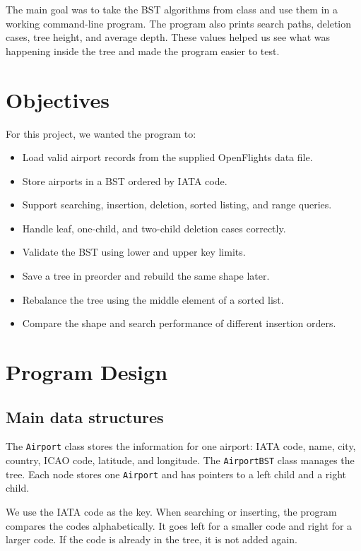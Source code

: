 \documentclass[12pt]{article}
\begin{document}
The main goal was to take the BST algorithms from class and use them in a working command-line program. The program also prints search paths, deletion cases, tree height, and average depth. These values helped us see what was happening inside the tree and made the program easier to test.

\section{Objectives}

For this project, we wanted the program to:

\begin{itemize}
    \item Load valid airport records from the supplied OpenFlights data file.
    \item Store airports in a BST ordered by IATA code.
    \item Support searching, insertion, deletion, sorted listing, and range queries.
    \item Handle leaf, one-child, and two-child deletion cases correctly.
    \item Validate the BST using lower and upper key limits.
    \item Save a tree in preorder and rebuild the same shape later.
    \item Rebalance the tree using the middle element of a sorted list.
    \item Compare the shape and search performance of different insertion orders.
\end{itemize}

\section{Program Design}

\subsection{Main data structures}

The \texttt{Airport} class stores the information for one airport: IATA code, name, city, country, ICAO code, latitude, and longitude. The \texttt{AirportBST} class manages the tree. Each node stores one \texttt{Airport} and has pointers to a left child and a right child.

We use the IATA code as the key. When searching or inserting, the program compares the codes alphabetically. It goes left for a smaller code and right for a larger code. If the code is already in the tree, it is not added again.
\end{document}
